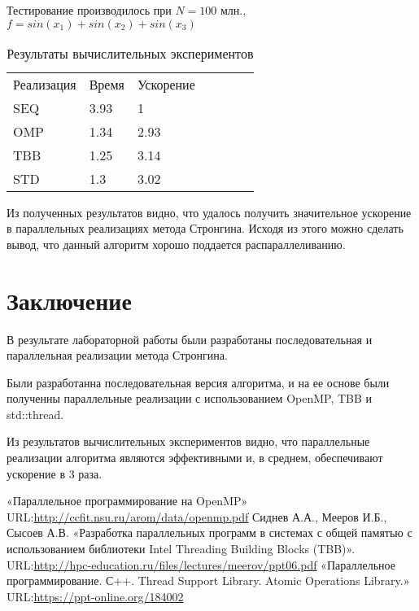 \documentclass{report}
\begin{document}
\par Тестирование производилось при $N=100$ млн., $f=sin(x_1)+sin(x_2)+sin(x_3)$
\\

\begin{table}[!h]
\begin{center}
\begin{tabular}{lllllll}
Реализация & Время & Ускорение   \\
SEQ        & 3.93 & 1           \\
OMP        & 1.34 & 2.93       \\
TBB        & 1.25 & 3.14       \\
STD        & 1.3 & 3.02        \\

\end{tabular}
\end{center}
\caption{Результаты вычислительных экспериментов}
\centering
\end{table}

\par Из полученных результатов видно, что удалось получить значительное ускорение в параллельных реализациях метода Стронгина. Исходя из этого можно сделать вывод, что данный алгоритм хорошо поддается распараллеливанию.
\newpage

\section*{Заключение}
В результате лабораторной работы были разработаны последовательная и параллельная реализации метода Стронгина.
\par Были разработанна последовательная версия алгоритма,  и на ее основе были полученны параллельные реализации с использованием OpenMP, TBB и std::thread. 
\par Из результатов вычислительных экспериментов видно, что параллельные реализации алгоритма являются эффективными и, в среднем, обеспечивают ускорение в 3 раза.
\newpage

\begin{thebibliography}{1}
\bibitem{} «Параллельное программирование на OpenMP»
\\URL:\url {http://ccfit.nsu.ru/arom/data/openmp.pdf}
 Сиднев А.А., Мееров И.Б., Сысоев А.В. «Разработка параллельных программ в системах с общей памятью с использованием библиотеки Intel Threading Building Blocks (TBB)».
\\URL:\url {http://hpc-education.ru/files/lectures/meerov/ppt06.pdf}
\bibitem{} «Параллельное программирование. С++. Thread Support Library. Atomic Operations Library.»
\\URL:\url {https://ppt-online.org/184002}
\end{thebibliography}
\newpage
\end{document}
